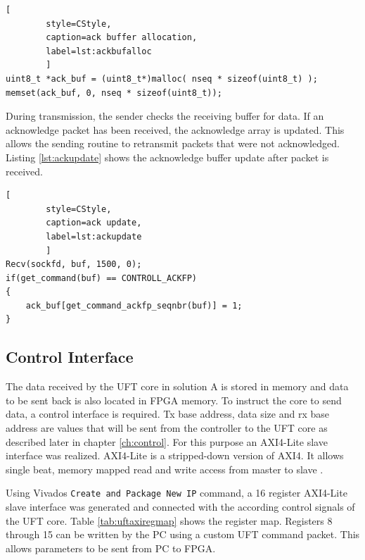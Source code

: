 \begin{minipage}{\linewidth}
    \begin{lstlisting}[
        style=CStyle, 
        caption=ack buffer allocation, 
        label=lst:ackbufalloc
        ]
uint8_t *ack_buf = (uint8_t*)malloc( nseq * sizeof(uint8_t) );
memset(ack_buf, 0, nseq * sizeof(uint8_t));\end{lstlisting}
\end{minipage}

\pagebreak
During transmission, the sender checks the receiving buffer for data. If an
acknowledge packet has been received, the acknowledge array is updated.
This allows the sending routine to retransmit packets that were not
acknowledged. Listing \ref{lst:ackupdate} shows the acknowledge buffer update
after packet is received.

\begin{minipage}{\linewidth}
    \begin{lstlisting}[
        style=CStyle, 
        caption=ack update, 
        label=lst:ackupdate
        ]
Recv(sockfd, buf, 1500, 0);
if(get_command(buf) == CONTROLL_ACKFP)
{
    ack_buf[get_command_ackfp_seqnbr(buf)] = 1;
}\end{lstlisting}
\end{minipage}


\subsection{Control Interface}
The data received by the UFT core in solution A is stored in memory and data to
be sent back
is also located in FPGA memory. To instruct the core to send data, a control
interface is required. Tx base address, data size and rx base address are values
that will be sent from the controller to the UFT core as described later in
chapter \ref{ch:control}. For this purpose an AXI4-Lite slave interface was
realized. AXI4-Lite is a stripped-down version of AXI4. It allows single beat,
memory mapped read and write access from master to slave \cite{axispecs}.

Using Vivados \texttt{Create and Package New IP} command, a 16 register
AXI4-Lite slave interface was generated and connected with the according control
signals of the UFT core. Table \ref{tab:uftaxiregmap} shows the register map.
Registers 8 through 15 can be written by the PC using a custom UFT command
packet. This allows parameters to be sent from PC to FPGA.

